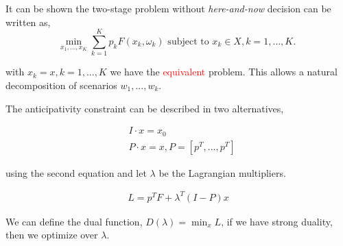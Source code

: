 \documentclass{beamerswitch}
\begin{document}
It can be shown the two-stage problem without \emph{here-and-now} decision can be written as,
\begin{equation}
    \underset{x_{1}, \ldots, x_{K}}{\min} \sum_{k=1}^{K} p_{k} F\left(x_{k}, \omega_{k}\right) \text { subject to } x_{k} \in X, k=1, \ldots, K \text {. }
\end{equation}

with \(x_k = x, k = 1, ..., K\) we have the \textcolor{red}{equivalent} problem. This allows a natural decomposition of scenarios \(w_1, ..., w_k\).

The anticipativity constraint can be described in two alternatives,

\begin{align*}
     & I \cdot x = x_0                    \\
     & P \cdot x = x, P = [p^T, ..., p^T]
\end{align*}

using the second equation and let \(\lambda\) be the Lagrangian multipliers.

\begin{align*}
    L = p^T F + \lambda^T(I-P)x
\end{align*}

We can define the dual function, \(D(\lambda) = \min_x L\), if we have strong duality, then we optimize over \(\lambda\).

\begin{frame}[allowframebreaks]
    
    
\end{frame}
\end{document}
